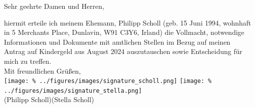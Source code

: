 \documentclass[
  fontsize=11pt,
  paper=a4,
  parskip=half,
  enlargefirstpage=on,    %
  fromalign=right,        %
  fromphone=on,           %
  fromrule=aftername,     %
  addrfield=off,           %
  backaddress=off,         %
  subject=beforeopening,  %
  locfield=narrow,        %
  foldmarks=on,           %
]{scrlttr2}
\begin{document}
\begin{letter}{}
  \opening{Sehr geehrte Damen und Herren,}

  hiermit erteile ich meinem Ehemann, Philipp Scholl (geb. 15 Juni 1994, wohnhaft in 5 Merchants Place, Dunlavin, W91 C3Y6, Irland) die Vollmacht, notwendige Informationen und Dokumente mit amtlichen Stellen im Bezug auf meinen Antrag auf Kindergeld aus August 2024 auszutauschen sowie Entscheidung für mich zu treffen.\\[1cm]%

  Mit freundlichen Grüßen,\\[.5cm]%
  \texttt{[image: \%
    ../figures/images/signature\_scholl.png]}%
  \hspace*{1.5cm}%
  \texttt{[image: \%
    ../figures/images/signature\_stella.png]}\\[-0.5cm]%
  (Philipp Scholl)\hspace*{2.5cm}(Stella Scholl)%

\end{letter}
\end{document}
